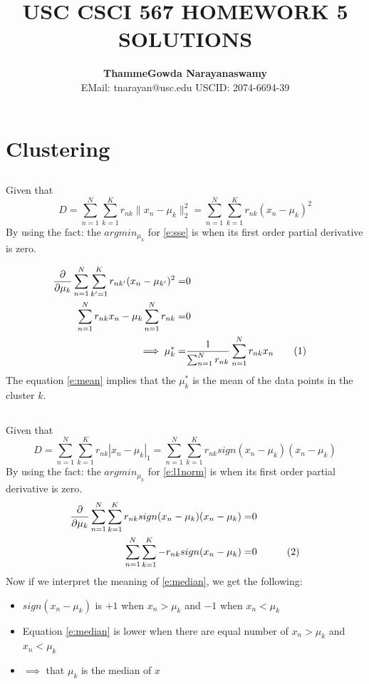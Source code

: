 \documentclass[a4paper,doc,notimes]{article}
\title{\noindent  \textbf{ USC CSCI 567 HOMEWORK 5 SOLUTIONS} }
\author{\textbf{ThammeGowda Narayanaswamy} \\
EMail: tnarayan@usc.edu  USCID: 2074-6694-39}
\newcommand\numberthis{\addtocounter{equation}{1}\tag{\theequation}}
\begin{document}
\maketitle

\section{Clustering}
\subsection{}
Given that 
\begin{equation}\label{e:sse}
	D = \sum_{n=1}^{N} \sum_{k=1}^{K} r_{nk} \parallel x_n - \mu_k \parallel^2_2 = \sum_{n=1}^{N} \sum_{k=1}^{K} r_{nk} (x_n - \mu_k)^2
\end{equation}
By using the fact: the $argmin_{\mu_k}$ for \ref{e:sse} is when its first order partial derivative is zero.

\begin{align*}
  \frac{\partial}{\partial \mu_k} \sum_{n=1}^{N} \sum_{k'=1}^{K} r_{nk'} (x_n - \mu_{k'})^2 =& 0 & \\
   \sum_{n=1}^{N} r_{nk} x_n - \mu_k \sum_{n=1}^{N} r_{nk}  =& 0 & \\ 
   \implies \mu_k^* =& \frac{1}{\sum_{n=1}^{N} r_{nk}} \sum_{n=1}^{N} r_{nk} x_n \numberthis \label{e:mean}
\end{align*}
The equation \ref{e:mean} implies that the $\mu_k^*$ is the mean of the data points in the cluster $k$.

\subsection{}
Given that 
\begin{equation}\label{e:l1norm}
	D = \sum_{n=1}^{N} \sum_{k=1}^{K} r_{nk} | x_n - \mu_k |_1 = \sum_{n=1}^{N} \sum_{k=1}^{K} r_{nk} sign(x_n - \mu_k) (x_n - \mu_k)
\end{equation}
By using the fact: the $argmin_{\mu_k}$ for \ref{e:l1norm} is when its first order partial derivative is zero.
\begin{align*}
 \frac{\partial}{\partial \mu_k}\sum_{n=1}^{N} \sum_{k=1}^{K} r_{nk} sign(x_n - \mu_k) (x_n - \mu_k) =& 0 & \\
 \sum_{n=1}^{N} \sum_{k=1}^{K} - r_{nk} sign(x_n - \mu_k) =& 0 & \numberthis \label{e:median}
\end{align*}
Now if we interpret the meaning of \ref{e:median}, we get the following:
\begin{itemize}
	
	\item $sign(x_n - \mu_k)$ is $+1$ when $x_n > \mu_k$ and $-1$ when $x_n < \mu_k$
	\item Equation \ref{e:median} is lower when there are equal number of $x_n > \mu_k$ and $x_n < \mu_k$
	\item $\implies$ that $\mu_k$ is the median of $x$
\end{itemize}
\end{document}
